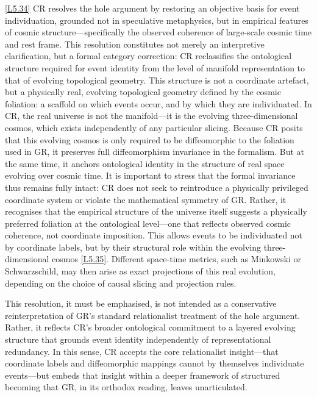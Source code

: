 \documentclass[12pt]{book}
\newcounter{logicanchor}
\newenvironment{logicanchorenv}[1]{\refstepcounter{logicanchor}\label{#1}}{}
\newcommand{\logiclink}[2]{\begin{logicanchorenv}{logic:#1}\end{logicanchorenv}\hyperref[appendix:#1]{[#1]}\xspace}
\begin{document}
\logiclink{L5.34}{} CR resolves the hole argument by restoring an objective basis for event individuation, grounded not in speculative metaphysics, but in empirical features of cosmic structure---specifically the observed coherence of large-scale cosmic time and rest frame. This resolution constitutes not merely an interpretive clarification, but a formal category correction: CR reclassifies the ontological structure required for event identity from the level of manifold representation to that of evolving topological geometry. This structure is not a coordinate artefact, but a physically real, evolving topological geometry defined by the cosmic foliation: a scaffold on which events occur, and by which they are individuated. In CR, the real universe is not the manifold---it is the evolving three-dimensional cosmos, which exists independently of any particular slicing. Because CR posits that this evolving cosmos is only required to be diffeomorphic to the foliation used in GR, it preserves full diffeomorphism invariance in the formalism. But at the same time, it anchors ontological identity in the structure of real space evolving over cosmic time. It is important to stress that the formal invariance thus remains fully intact: CR does not seek to reintroduce a physically privileged coordinate system or violate the mathematical symmetry of GR. Rather, it recognises that the empirical structure of the universe itself suggests a physically preferred foliation at the ontological level---one that reflects observed cosmic coherence, not coordinate imposition. This allows events to be individuated not by coordinate labels, but by their structural role within the evolving three-dimensional cosmos \logiclink{L5.35}{}. Different space-time metrics, such as Minkowski or Schwarzschild, may then arise as exact projections of this real evolution, depending on the choice of causal slicing and projection rules.

This resolution, it must be emphasised, is not intended as a conservative reinterpretation of GR's standard relationalist treatment of the hole argument. Rather, it reflects CR's broader ontological commitment to a layered evolving structure that grounds event identity independently of representational redundancy. In this sense, CR accepts the core relationalist insight---that coordinate labels and diffeomorphic mappings cannot by themselves individuate events---but embeds that insight within a deeper framework of structured becoming that GR, in its orthodox reading, leaves unarticulated.
\end{document}
